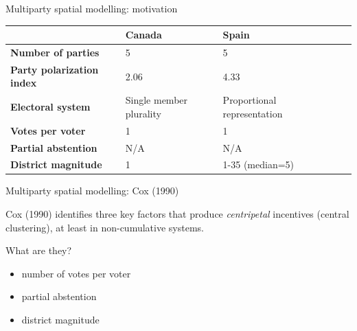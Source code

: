\documentclass[11pt,aspectratio=169]{beamer}
\begin{document}
\begin{frame}{Multiparty spatial modelling: motivation}



\begin{table}[]
\begin{tabular}{@{}lllll@{}}
\toprule
                                  & \textbf{Canada}         & \textbf{Spain}              &  &  \\ \midrule
\textbf{Number of parties}        & 5                       & 5                           &  &  \\
\textbf{Party polarization index} & 2.06                    & 4.33                        &  &  \\
\textbf{Electoral system}         & Single member plurality & Proportional representation &  &  \\
\textbf{Votes per voter}         & 1 & 1 &  &  \\
\textbf{Partial abstention} & N/A & N/A & & \\
\textbf{District magnitude} & 1 & 1-35 (median=5) & & \\
 \bottomrule
\end{tabular}
\end{table}

\end{frame}
\begin{frame}{Multiparty spatial modelling: Cox (1990)}

Cox (1990) identifies \alert{three} key factors that produce \textit{centripetal} incentives (central clustering), at least in non-cumulative systems. 

\begin{tcolorbox}
What are they? 
\end{tcolorbox}

\pause 
\begin{itemize}
\item number of votes per voter
\item partial abstention
\item district magnitude
\end{itemize}

\end{frame}
\end{document}
